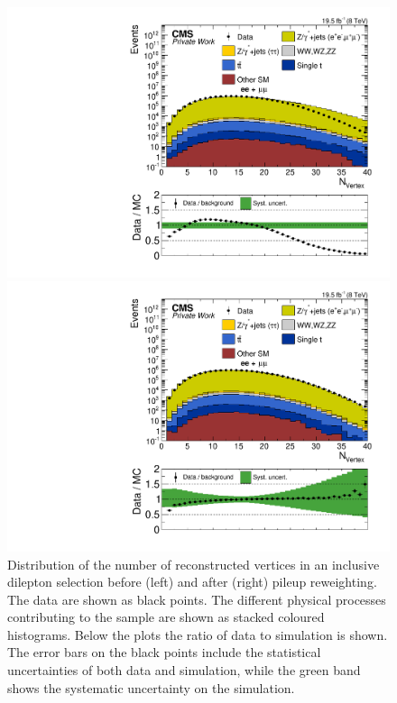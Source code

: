 \begin{figure}[htbp]
\centering
\begin{minipage}[t]{0.49\textwidth}
  \includegraphics[width=\textwidth]{plots/SELECTION/Inclusive_nVtx_Full2012_SF_TopReweighted_NOPU.pdf}
\end{minipage}
\begin{minipage}[t]{0.49\textwidth}
\includegraphics[width=\textwidth]{plots/SELECTION/Inclusive_nVtx_Full2012_SF_TopReweighted.pdf}
\end{minipage}
\caption{Distribution of the number of reconstructed vertices in an inclusive dilepton selection before (left) and after (right) pileup reweighting. The data are shown as black points. The different physical processes contributing to the sample are shown as stacked coloured histograms. Below the plots the ratio of data to simulation is shown. The error bars on the black points include the statistical uncertainties of both data and simulation, while the green band shows the systematic uncertainty on the simulation. }
\label{fig:PU}
\end{figure}   

